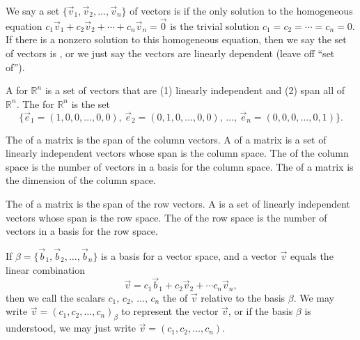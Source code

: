 \begin{definition} \label{def linear independence}
%
We say a set $\{\vec v_1,\vec v_2,\ldots,\vec v_n\}$ of vectors is  if the only solution to the homogeneous equation $c_1 \vec v_1+c_2\vec v_2+\cdots+c_n\vec v_n=\vec 0$ is the trivial solution $c_1=c_2=\cdots=c_n=0$. If there is a nonzero solution to this homogeneous equation, then we say the set of vectors is , or we just say the vectors are linearly dependent (leave off ``set of'').
\end{definition}

\begin{definition}[Basis]
A  for $\mathbb{R}^n$ is a set of vectors that are (1) linearly independent and (2) span all of $\mathbb{R}^n$.
The  for $\mathbb{R}^n$ is the set 
$$\{\vec e_1 = (1,0,0,\ldots,0,0),\, 
\vec e_2 = (0,1,0,\ldots,0,0),\, 
\ldots,\, 
\vec e_n = (0,0,0,\ldots,0,1)\}.$$
\end{definition}

\begin{definition} 
%
The  of a matrix is the span of the column vectors. 
A  of a matrix is a set of linearly independent vectors whose span is the column space. 
The  of the column space is the number of vectors in a basis for the column space. 
The  of a matrix is the dimension of the column space.
\end{definition}


\begin{definition} 
%
The  of a matrix is the span of the row vectors. 
A  is a set of linearly independent vectors whose span is the row space. 
The  of the row space is the number of vectors in a basis for the row space.
\end{definition}

\begin{definition}[Coordinates]
%
If $\beta=\{\vec b_1,\vec b_2,\ldots,\vec b_n\}$ is a basis for a vector space, and a vector $\vec v$ equals the linear combination 
$$ \vec v = c_1\vec b_1+c_2\vec v_2 + \cdots c_n\vec v_n, $$ then we call the scalars $c_1,\,c_2,\,\ldots,\, c_n$ the   of $\vec v$ relative to the basis $\beta$. We may write $\vec v = (c_1,c_2,\ldots, c_n)_\beta$ to represent the vector $\vec v$, or if the basis $\beta$ is understood, we may just write $\vec v = (c_1,c_2,\ldots, c_n)$.
\end{definition}

